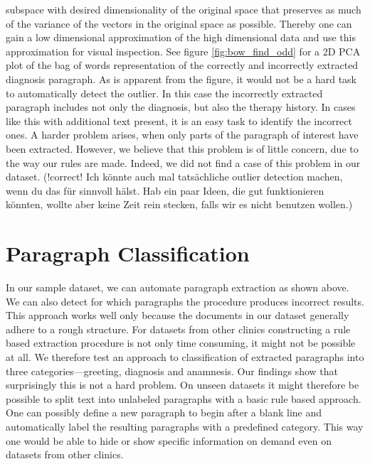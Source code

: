 subspace with desired dimensionality of the original space that preserves as much of the variance of the vectors in the original space as possible. Thereby one can gain a low dimensional approximation of the high dimensional data and use this approximation for visual inspection.
See figure \ref{fig:bow_find_odd} for a 2D PCA plot of the bag of words representation
of the correctly and incorrectly extracted diagnosis paragraph. As is apparent from the figure, it would not be a
hard task to automatically detect the outlier. In this case the incorrectly
extracted paragraph includes not only the diagnosis, but also the
therapy history. In cases like this with additional text present, it is an easy task to
identify the incorrect ones. A harder problem arises, when only parts
of the paragraph of interest have been extracted. However, we believe
that this problem is of little concern, due to the way our rules are made.
Indeed, we did not find a case
of this problem in our dataset. (!correct! Ich könnte auch mal tatsächliche outlier detection machen, wenn du das für sinnvoll hälst. Hab ein paar Ideen, die gut funktionieren könnten, wollte aber keine Zeit rein stecken, falls wir es nicht benutzen wollen.)





\section{Paragraph Classification}
In our sample dataset, we can automate paragraph extraction as shown above. We can also detect for which paragraphs the procedure produces incorrect results. This approach works well only because the documents in our dataset generally adhere to a rough structure. For datasets from other clinics constructing a rule based extraction procedure is not only time consuming, it might not be possible at all. We therefore test an approach to classification of extracted paragraphs into three categories---greeting, diagnosis and anamnesis. Our findings show that surprisingly this is not a hard problem. On unseen datasets it might therefore be possible to split text into unlabeled paragraphs with a basic rule based approach. One can possibly define a new paragraph to begin after a blank line and automatically label the resulting paragraphs with a predefined category. This way one would be able to hide or show specific information on demand even on datasets from other clinics.

